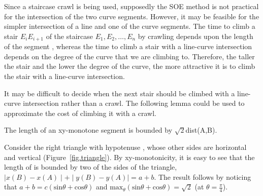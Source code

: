 Since a staircase crawl is being used, supposedly the SOE method is not practical 
for the intersection of the two curve segments.
However, it may be feasible for the simpler intersection of a line and one of the curve segments.
The time to climb a stair $E_{i}E_{i+1}$ of the staircase $E_{1},E_{2},\ldots,E_{n}$
by crawling depends upon the length of the segment , 
whereas the time to climb a stair with a line-curve intersection depends on the degree 
of the curve that we are climbing to.
Therefore, the taller the stair and the lower the degree of the curve,
the more attractive it is to climb the stair with a line-curve intersection.

It may be difficult to decide when the next stair should be climbed with a line-curve intersection
rather than a crawl.
The following lemma could be used to approximate the cost of climbing it with a crawl.

\begin{lemma}
\label{lem-bound}
The length of an xy-monotone segment  is bounded by $\sqrt{2}$dist(A,B).
\end{lemma}
Consider the right triangle with hypotenuse , whose other sides are horizontal
and vertical (Figure~\ref{fig.triangle}).
By xy-monotonicity, it is easy to see that the length of  is bounded by
two of the sides of the triangle, $\mid x(B) - x(A) \mid + \mid y(B) - y(A) \mid = a+b$.
The result follows by noticing that $a+b = c(\mbox{sin}\theta + \mbox{cos}\theta)$
and $\mbox{max}_{\theta} (\mbox{sin}\theta + \mbox{cos}\theta) = \sqrt{2}$ 
(at $\theta = \frac{\pi}{4}$).
\QED


